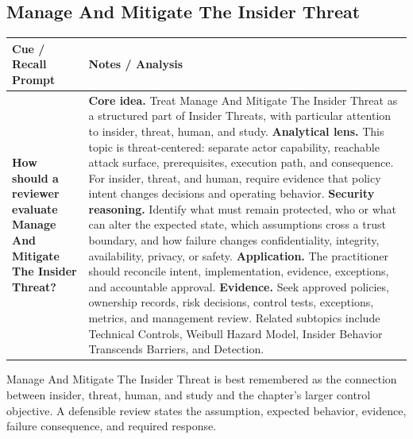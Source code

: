 \documentclass[11pt]{article}
\newcommand{\CornellHeader}{%
\rowcolor{Navy}\color{white}\bfseries Cue / Recall Prompt & \color{white}\bfseries Notes / Analysis\\\hline}
\newcommand{\CornellRow}[2]{%
\cellcolor{CueGray}\RaggedRight\textbf{#1} & \RaggedRight #2\\\hline}
\begin{document}
\subsection*{Manage And Mitigate The Insider Threat}
\begin{longtable}{>{\RaggedRight\arraybackslash}p{}|>{\RaggedRight\arraybackslash}p{}}
\CornellHeader
\CornellRow{How should a reviewer evaluate Manage And Mitigate The Insider Threat?}{\textbf{Core idea.} Treat Manage And Mitigate The Insider Threat as a structured part of Insider Threats, with particular attention to insider, threat, human, and study. \textbf{Analytical lens.} This topic is threat-centered: separate actor capability, reachable attack surface, prerequisites, execution path, and consequence. For insider, threat, and human, require evidence that policy intent changes decisions and operating behavior. \textbf{Security reasoning.} Identify what must remain protected, who or what can alter the expected state, which assumptions cross a trust boundary, and how failure changes confidentiality, integrity, availability, privacy, or safety. \textbf{Application.} The practitioner should reconcile intent, implementation, evidence, exceptions, and accountable approval. \textbf{Evidence.} Seek approved policies, ownership records, risk decisions, control tests, exceptions, metrics, and management review. Related subtopics include Technical Controls, Weibull Hazard Model, Insider Behavior Transcends Barriers, and Detection.}
\end{longtable}
\begin{topicsummary}
Manage And Mitigate The Insider Threat is best remembered as the connection between insider, threat, human, and study and the chapter's larger control objective. A defensible review states the assumption, expected behavior, evidence, failure consequence, and required response.
\end{topicsummary}
\end{document}
